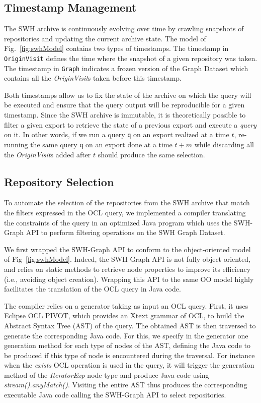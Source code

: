 \subsection{Timestamp Management}

The SWH archive is continuously evolving over time by crawling snapshots of repositories and updating the current archive state. The model of Fig.~\ref{fig:swhModel} contains two types of timestamps. The timestamp in \texttt{OriginVisit} defines the time where the snapshot of a given repository was taken.
The timestamp in \texttt{Graph} indicates a frozen version of the Graph Dataset which contains all the \textit{OriginVisit}s taken before this timestamp. 

Both timestamps allow us to fix the state of the archive on which the query will be executed and ensure that the query output will be reproducible for a given timestamp.  
Since the SWH archive is immutable, it is theoretically possible to filter a given export to retrieve the state of a previous export and execute a \textit{query} on it. 
In other words, if we run a query \texttt{q} on an export realized at a time $t$, re-running the same query \texttt{q} on an export done at a time $t+m$ while discarding all the \textit{OriginVisit}s  added after $t$ should produce the same selection.

\subsection{Repository Selection}

To automate the selection of the repositories from the SWH archive that match the filters expressed in the OCL query, we implemented a compiler translating the constraints of the query in an optimized Java program which uses the SWH-Graph API to perform filtering operations on the SWH Graph Dataset. 

We first wrapped the SWH-Graph API to conform to the object-oriented model of Fig~\ref{fig:swhModel}.
Indeed, the SWH-Graph API is not fully object-oriented, and relies on static methods to retrieve node properties  to improve its efficiency (i.e., avoiding object creation). 
Wrapping this API to the same OO model highly facilitates the translation of the OCL query in Java code.

The compiler relies on a generator taking as input an OCL query.
First, it uses Eclipse OCL PIVOT, which provides an Xtext grammar of OCL, to build the Abstract Syntax Tree (AST) of the query.
The obtained AST is then traversed to generate the corresponding Java code.
For this, we specify in the generator one generation method for each type of nodes of the AST, defining the Java code to be produced if this type of node is encountered during the traversal.
For instance when the \textit{exists} OCL operation is used in the query, it will trigger the generation method of the \textit{IteratorExp} node type and produce Java code using \textit{stream().anyMatch()}.
Visiting the entire AST thus produces the corresponding executable Java code calling the SWH-Graph API to select repositories.

